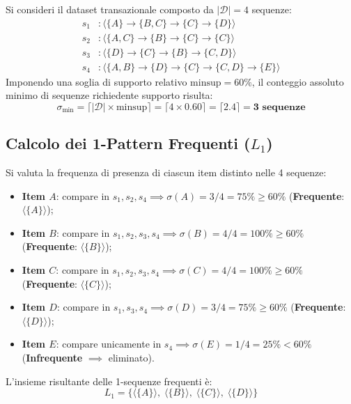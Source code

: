 Si consideri il dataset transazionale composto da $|\mathcal{D}| = 4$ sequenze:
\begin{align}
s_1&: \langle \{A\} \to \{B, C\} \to \{C\} \to \{D\} \rangle \nonumber \\
s_2&: \langle \{A, C\} \to \{B\} \to \{C\} \to \{C\} \rangle \nonumber \\
s_3&: \langle \{D\} \to \{C\} \to \{B\} \to \{C, D\} \rangle \nonumber \\
s_4&: \langle \{A, B\} \to \{D\} \to \{C\} \to \{C, D\} \to \{E\} \rangle
\end{align}
Imponendo una soglia di supporto relativo $\text{minsup} = 60\%$, il conteggio assoluto minimo di sequenze richiedente supporto risulta:
\begin{equation}
\sigma_{\min} = \lceil |\mathcal{D}| \times \text{minsup} \rceil = \lceil 4 \times 0.60 \rceil = \lceil 2.4 \rceil = \mathbf{3 \text{ sequenze}}
\end{equation}

\FloatBarrier
\subsection{Calcolo dei 1-Pattern Frequenti ($L_1$)}
Si valuta la frequenza di presenza di ciascun item distinto nelle 4 sequenze:
\begin{itemize}
    \item \textbf{Item $A$}: compare in $s_1, s_2, s_4 \implies \sigma(A) = 3 / 4 = 75\% \ge 60\%$ (\textbf{Frequente}: $\langle \{A\} \rangle$);
    \item \textbf{Item $B$}: compare in $s_1, s_2, s_3, s_4 \implies \sigma(B) = 4 / 4 = 100\% \ge 60\%$ (\textbf{Frequente}: $\langle \{B\} \rangle$);
    \item \textbf{Item $C$}: compare in $s_1, s_2, s_3, s_4 \implies \sigma(C) = 4 / 4 = 100\% \ge 60\%$ (\textbf{Frequente}: $\langle \{C\} \rangle$);
    \item \textbf{Item $D$}: compare in $s_1, s_3, s_4 \implies \sigma(D) = 3 / 4 = 75\% \ge 60\%$ (\textbf{Frequente}: $\langle \{D\} \rangle$);
    \item \textbf{Item $E$}: compare unicamente in $s_4 \implies \sigma(E) = 1 / 4 = 25\% < 60\%$ (\textbf{Infrequente} $\implies$ eliminato).
\end{itemize}

L'insieme risultante delle 1-sequenze frequenti è:
\begin{equation}
L_1 = \big\{ \langle \{A\} \rangle, \; \langle \{B\} \rangle, \; \langle \{C\} \rangle, \; \langle \{D\} \rangle \big\}
\end{equation}

